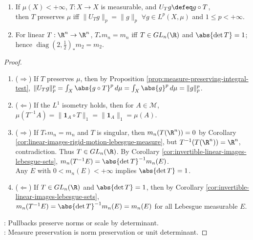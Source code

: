 \begin{proposition} \label{prop:koopman-isometry-and-linear-measure-preservation} 
\begin{enumerate}[label=(\roman*)]
\setlength{\itemsep}{0pt}
\item If $\mu(X)<+\infty$, $T:X\to X$ is measurable, and $U_Tg\defeq g\circ T$,\\
then $T$ preserves $\mu$ iff $\|U_Tg\|_p=\|g\|_p$ $\forall g\in L^p(X,\mu)$ and $1\leq p<+\infty$.
\item For linear $T:\R^n\to\R^n$, $T_*m_n=m_n$ iff $T\in GL_n(\R)$ and $\abs{\det T}=1$; hence $\operatorname{diag}(2,\frac12)_*m_2=m_2$.
\end{enumerate}
\begin{proof}
\begin{enumerate}[label=(\roman*)]
\setlength{\itemsep}{0pt}
\item[$(i)$] ($\Rightarrow$) If $T$ preserves $\mu$, then by Proposition \ref{prop:measure-preserving-integral-test}, $\|U_Tg\|_p^p=\int_X\abs{g\circ T}^p\,d\mu=\int_X\abs{g}^p\,d\mu=\|g\|_p^p$.
\item[$(i)$] ($\Leftarrow$) If the $L^1$ isometry holds, then for $A\in\mathcal{M}$, $\mu(T^{-1}A)=\|\mathbf{1}_A\circ T\|_1=\|\mathbf{1}_A\|_1=\mu(A)$.
\item[$(ii)$] ($\Rightarrow$) If $T_*m_n=m_n$ and $T$ is singular, then $m_n(T(\R^n))=0$ by Corollary \ref{cor:linear-images-rigid-motion-lebesgue-measure}, but $T^{-1}(T(\R^n))=\R^n$, contradiction. Thus $T\in GL_n(\R)$. By Corollary \ref{cor:invertible-linear-images-lebesgue-sets}, $m_n(T^{-1}E)=\abs{\det T}^{-1}m_n(E)$.\\
Any $E$ with $0<m_n(E)<+\infty$ implies $\abs{\det T}=1$.
\item[$(ii)$] ($\Leftarrow$) If $T\in GL_n(\R)$ and $\abs{\det T}=1$, then by Corollary \ref{cor:invertible-linear-images-lebesgue-sets},\\
$m_n(T^{-1}E)=\abs{\det T}^{-1}m_n(E)=m_n(E)$ for all Lebesgue measurable $E$.
\end{enumerate}
: Pullbacks preserve norms or scale by determinant.\\
: Measure preservation is norm preservation or unit determinant.
\end{proof}
\end{proposition}

